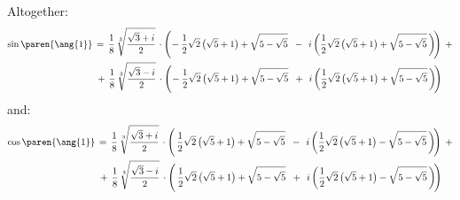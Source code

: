 Altogether:
\begin{equation*}
\begin{split}
 \sin\paren{\ang{1}} \,
 &= \, \frac{1}{8} \, \sqrt[3]{\frac{\sqrt{3} + i}{2}}
   \, \cdot
   \Bigg( \!
     - \frac{1}{2} \sqrt{2} \, \big(\sqrt{5} + 1 \big)
     + \sqrt{5 - \sqrt{5}} \;\;
     - \,\; i \, \bigg(
     \frac{1}{2} \sqrt{2} \, \big(\sqrt{5} + 1 \big)
     + \sqrt{5 - \sqrt{5}} \,
     \bigg) \!
   \Bigg) \,\; +
 \\
   &\, + \, \frac{1}{8} \, \sqrt[3]{\frac{\sqrt{3} - i}{2}}
   \, \cdot
   \Bigg( \!
     - \frac{1}{2} \sqrt{2} \, \big(\sqrt{5} + 1 \big)
     + \sqrt{5 - \sqrt{5}} \;\;
     + \,\; i \, \bigg(
     \frac{1}{2} \sqrt{2} \, \big(\sqrt{5} + 1 \big)
     + \sqrt{5 - \sqrt{5}} \,
     \bigg) \!
   \Bigg)
\end{split}
\end{equation*}
and:
\begin{equation*}
\begin{split}
 \cos\paren{\ang{1}} \,
 &= \, \frac{1}{8} \, \sqrt[3]{\frac{\sqrt{3} + i}{2}}
   \, \cdot
   \Bigg( \,
     \frac{1}{2} \sqrt{2} \, \big(\sqrt{5} + 1 \big)
     + \sqrt{5 - \sqrt{5}} \;\;
     - \,\; i \, \bigg(
     \frac{1}{2} \sqrt{2} \, \big(\sqrt{5} + 1 \big)
     - \sqrt{5 - \sqrt{5}} \,
     \bigg) \!
   \Bigg) \,\; +
 \\
   &\, + \, \frac{1}{8} \, \sqrt[3]{\frac{\sqrt{3} - i}{2}}
   \, \cdot
   \Bigg( \,
     \frac{1}{2} \sqrt{2} \, \big(\sqrt{5} + 1 \big)
     + \sqrt{5 - \sqrt{5}} \;\;
     + \,\; i \, \bigg(
     \frac{1}{2} \sqrt{2} \, \big(\sqrt{5} + 1 \big)
     - \sqrt{5 - \sqrt{5}} \,
     \bigg) \!
   \Bigg)
\end{split}
\end{equation*}


